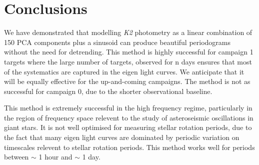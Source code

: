 \documentclass[useAMS, usenatbib]{aastex}
\begin{document}
\section{Conclusions}
We have demonstrated that modelling {\it K2} photometry as a linear combination
of 150 PCA components plus a sinusoid can produce beautiful periodograms
without the need for detrending.
This method is highly successful for campaign 1 targets where the large number
of targets, observed for n days ensures that most of the systematics are
captured in the eigen light curves.
We anticipate that it will be equally effective for the up-and-coming
campaigns.
The method is not as successful for campaign 0, due to the shorter
observational baseline.

This method is extremely successful in the high frequency regime, particularly
in the region of frequency space relevent to the study of asteroseismic
oscillations in giant stars.
It is not well optimised for measuring stellar rotation periods, due to the
fact that many eigen light curves are dominated by periodic variation on
timescales relevent to stellar rotation periods.
This method works well for periods between $\sim$ 1 hour and $\sim$ 1 day.



\end{document}

